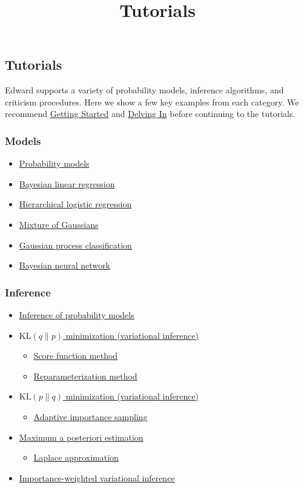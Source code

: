 \title{Tutorials}

\subsection{Tutorials}

Edward supports a variety of probability models, inference
algorithms, and criticism procedures. Here we show a few key examples from each
category. We recommend \href{getting-started.html}{Getting Started} and
\href{delving-in.html}{Delving In} before continuing to the tutorials.

\subsubsection{Models}

\begin{itemize}
\item \href{tut_model.html}{Probability models}
\item \href{tut_bayesian_linear_regression.html}{Bayesian linear regression}
\item \href{#}{Hierarchical logistic regression}
\item \href{tut_mixture_gaussian.html}{Mixture of Gaussians}
\item \href{tut_gp_classification.html}{Gaussian process classification}
\item \href{tut_bayesian_nn.html}{Bayesian neural network}
\end{itemize}

\subsubsection{Inference}

\begin{itemize}
  \item \href{tut_inference.html}{Inference of probability models}
  \item \href{tut_KLqp.html}{$\text{KL}(q\|p)$ minimization (variational
  inference)}
  \begin{itemize}
    \item \href{tut_KLqp_score.html}{Score function method}
    \item \href{tut_KLqp_reparam.html}{Reparameterization method}
  \end{itemize}
  \item \href{tut_KLpq.html}{$\text{KL}(p\|q)$ minimization (variational
  inference)}
  \begin{itemize}
    \item \href{tut_KLpq_ais.html}{Adaptive importance sampling}
  \end{itemize}
  \item \href{tut_MAP.html}{Maximum a posteriori estimation}
  \begin{itemize}
    \item \href{tut_MAP_Laplace.html}{Laplace approximation}
  \end{itemize}
  \item \href{#}{Importance-weighted variational inference}
\end{itemize}

